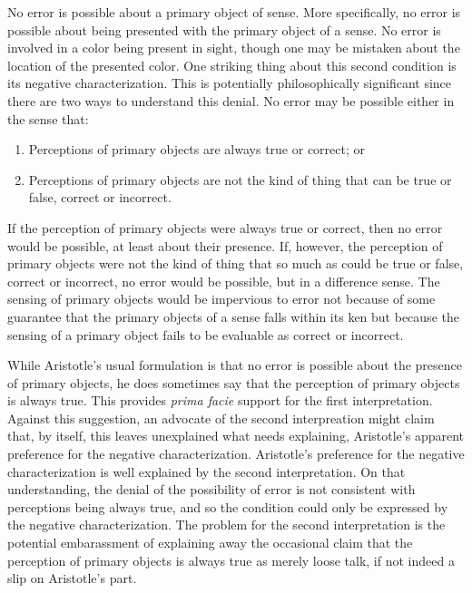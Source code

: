 No error is possible about a primary object of sense. More specifically, no error is possible about being presented with the primary object of a sense. No error is involved in a color being present in sight, though one may be mistaken about the location of the presented color. One striking thing about this second condition is its negative characterization. This is potentially philosophically significant since there are two ways to understand this denial. No error may be possible either in the sense that:
\begin{enumerate}[(1)]
	\item Perceptions of primary objects are always true or correct; or
	\item Perceptions of primary objects are not the kind of thing that can be true or false, correct or incorrect.
\end{enumerate}
If the perception of primary objects were always true or correct, then no error would be possible, at least about their presence. If, however, the perception of primary objects were not the kind of thing that so much as could be true or false, correct or incorrect, no error would be possible, but in a difference sense. The sensing of primary objects would be impervious to error not because of some guarantee that the primary objects of a sense falls within its ken but because the sensing of a primary object fails to be evaluable as correct or incorrect.

While Aristotle's usual formulation is that no error is possible about the presence of primary objects, he does sometimes say that the perception of primary objects is always true. This provides \emph{prima facie} support for the first interpretation. Against this suggestion, an advocate of the second interpreation might claim that, by itself, this leaves unexplained what needs explaining, Aristotle's apparent preference for the negative characterization. Aristotle's preference for the negative characterization is well explained by the second interpretation. On that understanding, the denial of the possibility of error is not consistent with perceptions being always true, and so the condition could only be expressed by the negative characterization. The problem for the second interpretation is the potential embarassment of explaining away the occasional claim that the perception of primary objects is always true as merely loose talk, if not indeed a slip on Aristotle's part.

